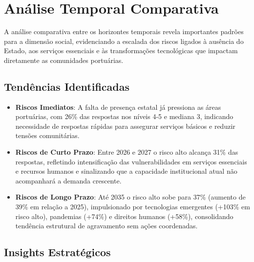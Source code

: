 \documentclass[
  portuguese,
  letterpaper,
  DIV=11,
  numbers=noendperiod]{scrreprt}
\providecommand{\tightlist}{%
  \setlength{\itemsep}{0pt}\setlength{\parskip}{0pt}}
\begin{document}
\section{Análise Temporal
Comparativa}\label{anuxe1lise-temporal-comparativa-3}

A análise comparativa entre os horizontes temporais revela importantes
padrões para a dimensão social, evidenciando a escalada dos riscos
ligados à ausência do Estado, aos serviços essenciais e às
transformações tecnológicas que impactam diretamente as comunidades
portuárias.

\subsection{Tendências
Identificadas}\label{tenduxeancias-identificadas-3}

\begin{itemize}
\tightlist
\item
  \textbf{Riscos Imediatos}: A falta de presença estatal já pressiona as
  áreas portuárias, com 26\% das respostas nos níveis 4-5 e mediana 3,
  indicando necessidade de respostas rápidas para assegurar serviços
  básicos e reduzir tensões comunitárias.
\item
  \textbf{Riscos de Curto Prazo}: Entre 2026 e 2027 o risco alto alcança
  31\% das respostas, refletindo intensificação das vulnerabilidades em
  serviços essenciais e recursos humanos e sinalizando que a capacidade
  institucional atual não acompanhará a demanda crescente.
\item
  \textbf{Riscos de Longo Prazo}: Até 2035 o risco alto sobe para 37\%
  (aumento de 39\% em relação a 2025), impulsionado por tecnologias
  emergentes (+103\% em risco alto), pandemias (+74\%) e direitos
  humanos (+58\%), consolidando tendência estrutural de agravamento sem
  ações coordenadas.
\end{itemize}

\subsection{Insights Estratégicos}\label{insights-estratuxe9gicos-3}
\end{document}
